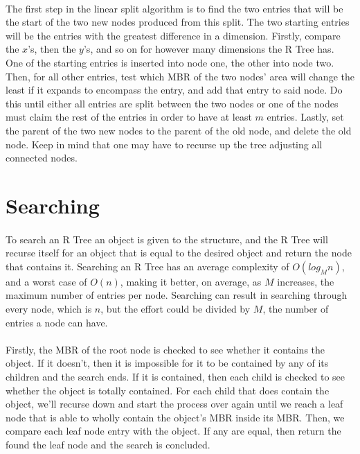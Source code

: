 \documentclass{article}
\begin{document}
\begin{multicols}{2}[]
\paragraph{}
The first step in the linear split algorithm is to find the two entries that will be the
start of the two new nodes produced from this split. The two starting entries will be the
entries with the greatest difference in a dimension. Firstly, compare the $x$'s, then the $y$'s,
and so on for however many dimensions the R Tree has. One of the starting entries is inserted into node one,
the other into node two. Then, for all other entries, test which MBR of the two nodes' area
will change the least if it expands to encompass the entry, and add that entry to said node. Do this
until either all entries are split between the two nodes or one of the nodes must claim the
rest of the entries in order to have at least $m$ entries. Lastly, set the parent of the two
new nodes to the parent of the old node, and delete the old node. Keep in mind that one may have to
recurse up the tree adjusting all connected nodes.
\section{Searching}
\paragraph{}
To search an R Tree an object is given to the structure, and the R Tree will recurse itself for
an object that is equal to the desired object and return the node that contains it. Searching an R Tree has an average complexity
of $O(log_Mn)$, and a worst case of $O(n)$, making it better, on average, as $M$ increases, the maximum number of entries
per node. Searching can result in searching through every node, which is $n$, but the effort could be divided by $M$, the
number of entries a node can have.
\paragraph{}
Firstly, the MBR of the root node is checked to see whether it contains the object. If it doesn't, then it is impossible for it to be contained by any of its children and the search ends.
If it is contained, then each child is checked to see whether the object is totally contained.
For each child that does contain the object, we'll recurse down and start the process over again until we reach a leaf node that
is able to wholly contain the object's MBR inside its MBR. Then, we compare each leaf node entry with the object. If any are equal, then
return the found the leaf node and the search is concluded.


\end{multicols}
\end{document}
